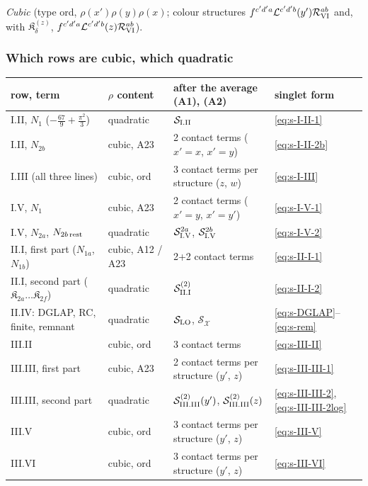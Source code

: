 \documentclass[10pt]{article}
\begin{document}
\emph{Cubic} (type ord, $\rho(x')\rho(y)\rho(x)$; colour structures $f^{c'd'a}\mathcal{L}^{c'd'b}(y')\mathcal{R}^{ab}_{\rm VI}$ and, with $\mathfrak{K}_{\delta}^{(z)}$, $f^{c'd'a}\mathcal{L}^{c'd'b}(z)\mathcal{R}^{ab}_{\rm VI}$).

\subsubsection{Which rows are cubic, which quadratic}
\begin{center}
\renewcommand{\arraystretch}{1.3}
\small\begin{tabular}{|l|l|l|l|}
\hline
row, term & $\rho$ content & after the average (A1), (A2) & singlet form \\ \hline
I.II, $N_{1}$ ($-\frac{67}{9}+\frac{\pi^{2}}{3}$) & quadratic & $\mathcal{S}_{\rm I.II}$ & \eqref{eq:s-I-II-1} \\
I.II, $N_{2b}$ & cubic, A23 & 2 contact terms ($x'{=}x$, $x'{=}y$) & \eqref{eq:s-I-II-2b} \\
I.III (all three lines) & cubic, ord & 3 contact terms per structure ($z$, $w$) & \eqref{eq:s-I-III} \\
I.V, $N_{1}$ & cubic, A23 & 2 contact terms ($x'{=}y$, $x'{=}y'$) & \eqref{eq:s-I-V-1} \\
I.V, $N_{2a}$, $N_{2b\,\rm rest}$ & quadratic & $\mathcal{S}^{2a}_{\rm I.V}$, $\mathcal{S}^{2b}_{\rm I.V}$ & \eqref{eq:s-I-V-2} \\
II.I, first part ($N_{1a}$, $N_{1b}$) & cubic, A12 / A23 & 2+2 contact terms & \eqref{eq:s-II-I-1} \\
II.I, second part ($\mathfrak{K}_{2a}\dots\mathfrak{K}_{2f}$) & quadratic & $\mathcal{S}^{(2)}_{\rm II.I}$ & \eqref{eq:s-II-I-2} \\
II.IV: DGLAP, RC, finite, remnant & quadratic & $\mathcal{S}_{\rm LO}$, $\mathcal{S}_{\mathcal{X}}$ & \eqref{eq:s-DGLAP}--\eqref{eq:s-rem} \\
III.II & cubic, ord & 3 contact terms & \eqref{eq:s-III-II} \\
III.III, first part & cubic, A23 & 2 contact terms per structure ($y'$, $z$) & \eqref{eq:s-III-III-1} \\
III.III, second part & quadratic & $\mathcal{S}^{(2)}_{\rm III.III}(y')$, $\mathcal{S}^{(2)}_{\rm III.III}(z)$ & \eqref{eq:s-III-III-2}, \eqref{eq:s-III-III-2log} \\
III.V & cubic, ord & 3 contact terms per structure ($y'$, $z$) & \eqref{eq:s-III-V} \\
III.VI & cubic, ord & 3 contact terms per structure ($y'$, $z$) & \eqref{eq:s-III-VI} \\ \hline
\end{tabular}
\end{center}
\end{document}
